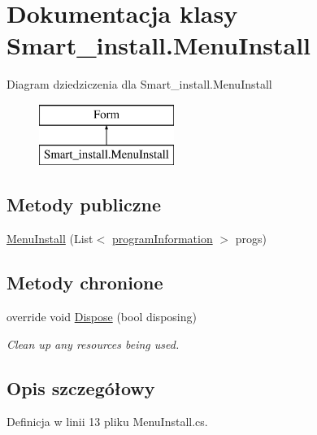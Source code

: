 \hypertarget{class_smart__install_1_1_menu_install}{\section{Dokumentacja klasy Smart\+\_\+install.\+Menu\+Install}
\label{class_smart__install_1_1_menu_install}
}
Diagram dziedziczenia dla Smart\+\_\+install.\+Menu\+Install\begin{figure}[H]
\begin{center}
\leavevmode
\includegraphics[height=2.000000cm]{class_smart__install_1_1_menu_install}
\end{center}
\end{figure}
\subsection*{Metody publiczne}
\begin{DoxyCompactItemize}
\item 
\hyperlink{class_smart__install_1_1_menu_install_a33c8f9d55d877fd5c471dae0f0d6d4dd}{Menu\+Install} (List$<$ \hyperlink{class_smart__install_1_1program_information}{program\+Information} $>$ progs)
\end{DoxyCompactItemize}
\subsection*{Metody chronione}
\begin{DoxyCompactItemize}
\item 
override void \hyperlink{class_smart__install_1_1_menu_install_af0e1e2239a2c2c3aa39a2ec98e9d302c}{Dispose} (bool disposing)
\begin{DoxyCompactList}\small\item\em Clean up any resources being used. \end{DoxyCompactList}\end{DoxyCompactItemize}


\subsection{Opis szczegółowy}


Definicja w linii 13 pliku Menu\+Install.\+cs.



